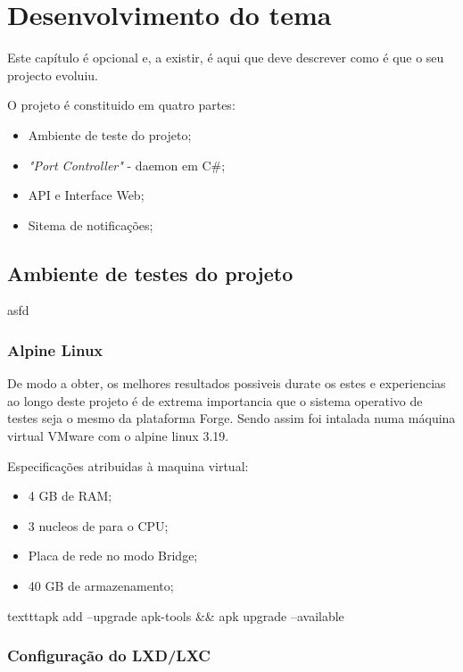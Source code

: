 \chapter{Desenvolvimento do tema}
\label{cap:experiments}

Este capítulo é opcional e, a existir, é aqui que deve descrever como é que o seu projecto evoluiu.

O projeto é constituido em quatro partes:

\begin{itemize}
    \item Ambiente de teste do projeto;
    \item \textit{"Port Controller"} - daemon em C\#;
    \item API e Interface Web;
    \item Sitema de notificações;
\end{itemize}


\section{Ambiente de testes do projeto}

asfd

\subsection{Alpine Linux}

De modo a obter, os melhores resultados possiveis durate os estes e experiencias
ao longo deste projeto é de extrema importancia que o sistema operativo de testes
seja o mesmo da plataforma Forge. Sendo assim foi intalada numa máquina virtual
VMware com o alpine linux 3.19.

Especificações atribuidas à maquina virtual:

\begin{itemize}
    \item 4 GB de RAM;
    \item 3 nucleos de para o CPU;
    \item Placa de rede no modo Bridge;
    \item 40 GB de armazenamento;
\end{itemize}


texttt{apk add --upgrade apk-tools \&\& apk upgrade --available}

\subsection{Configuração do LXD/LXC}

